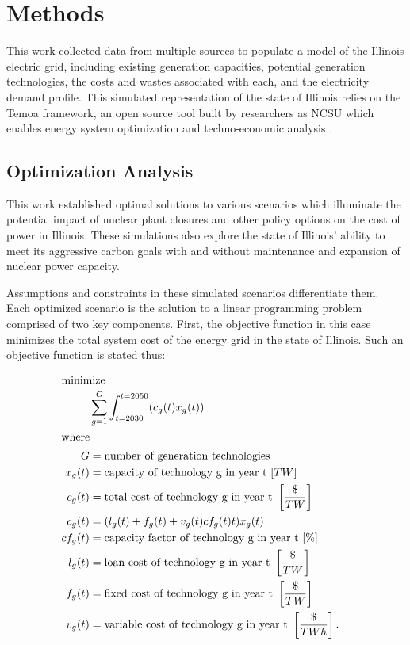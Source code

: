 \section{Methods}\label{sec:methods}
This work collected data from multiple sources to populate a model of the 
Illinois electric grid, including existing generation capacities, potential 
generation technologies, the costs and wastes associated with each, and the 
electricity demand profile. This simulated representation of the state of 
Illinois relies on the Temoa framework, an open source tool built by 
researchers as \gls{NCSU} which enables energy system optimization and 
techno-economic analysis 
\cite{decarolis_temoa_2010,decarolis_modelling_2016,decarolis_formalizing_2017}.

\subsection{Optimization Analysis}
This work established optimal solutions to 
various scenarios which illuminate the potential impact of nuclear plant 
closures and other policy options on the cost of power in Illinois. These 
simulations  also explore the state of Illinois' ability to meet its aggressive 
carbon goals with and without maintenance and expansion of nuclear power 
capacity. 

Assumptions and constraints in these simulated scenarios differentiate them. 
Each optimized scenario is the solution to a linear programming 
problem  comprised of two key components. First, the objective function in this 
case minimizes the total system cost of the energy grid in the state of 
Illinois. 
Such an objective function is stated thus:

\begin{align}
\intertext{minimize} 
        &\sum_{g=1}^G\int_{t=2030}^{t=2050} (c_g(t)x_g(t))\\
\intertext{where}
        G&=\text{number of generation technologies}&\nonumber\\
        x_g(t)&=\text{capacity of technology g in year t }[TW] &\nonumber\\
        c_g(t)&=\text{total cost of technology g in year t }\left[\frac{\$}{TW}\right]&\nonumber\\
        c_g(t)&= (l_g(t) + f_g(t) + v_g(t)cf_g(t)t)x_g(t)\nonumber\\
        cf_g(t)&=\text{capacity factor of technology g in year t }[\%] &\nonumber\\
        l_g(t)&=\text{loan cost of technology g in year t }\left[\frac{\$}{TW}\right]&\nonumber\\
        f_g(t)&=\text{fixed cost of technology g in year t }\left[\frac{\$}{TW}\right]&\nonumber\\
        v_g(t)&=\text{variable cost of technology g in year t }\left[\frac{\$}{TWh}\right].&\nonumber
\end{align}

